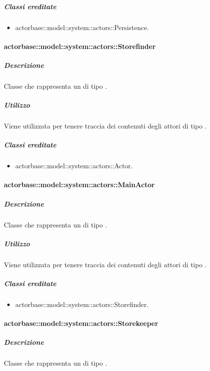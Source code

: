 \documentclass{scalatekids-article}
\begin{document}
\subparagraph{Classi ereditate}

\begin{itemize}
\item actorbase::model::system::actors::Persistence.
\end{itemize}

\paragraph{actorbase::model::system::actors::Storefinder}

\subparagraph{Descrizione}

Classe che rappresenta un  di tipo .

\subparagraph{Utilizzo}

Viene utilizzata per tenere traccia dei contenuti degli attori di tipo
.

\subparagraph{Classi ereditate}

\begin{itemize}
\item actorbase::model::system::actors::Actor.
\end{itemize}

\paragraph{actorbase::model::system::actors::MainActor}

\subparagraph{Descrizione}

Classe che rappresenta un  di tipo .

\subparagraph{Utilizzo}

Viene utilizzata per tenere traccia dei contenuti degli attori di tipo
.

\subparagraph{Classi ereditate}

\begin{itemize}
\item actorbase::model::system::actors::Storefinder.
\end{itemize}

\paragraph{actorbase::model::system::actors::Storekeeper}

\subparagraph{Descrizione}

Classe che rappresenta un  di tipo .
\end{document}
